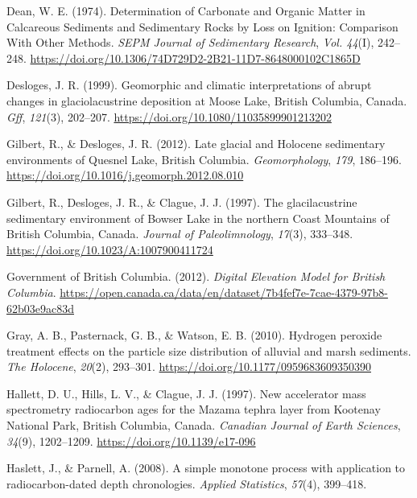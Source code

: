 \documentclass[
  letterpaper,
  DIV=11,
  numbers=noendperiod]{scrartcl}
\newlength{\cslhangindent}
\newenvironment{CSLReferences}[2] %
 {\begin{list}{}{%
  \setlength{\itemindent}{0pt}
  \setlength{\leftmargin}{0pt}
  \setlength{\parsep}{0pt}
  \ifodd #1
   \setlength{\leftmargin}{\cslhangindent}
   \setlength{\itemindent}{-1\cslhangindent}
  \fi
  \setlength{\itemsep}{#2\baselineskip}}}
 {\end{list}}
\begin{document}
\begin{CSLReferences}{1}{0}
Dean, W. E. (1974). {Determination of Carbonate and Organic Matter in
Calcareous Sediments and Sedimentary Rocks by Loss on Ignition:
Comparison With Other Methods}. \emph{SEPM Journal of Sedimentary
Research}, \emph{Vol. 44}(I), 242--248.
\url{https://doi.org/10.1306/74D729D2-2B21-11D7-8648000102C1865D}

Desloges, J. R. (1999). {Geomorphic and climatic interpretations of
abrupt changes in glaciolacustrine deposition at Moose Lake, British
Columbia, Canada}. \emph{Gff}, \emph{121}(3), 202--207.
\url{https://doi.org/10.1080/11035899901213202}

Gilbert, R., \& Desloges, J. R. (2012). {Late glacial and Holocene
sedimentary environments of Quesnel Lake, British Columbia}.
\emph{Geomorphology}, \emph{179}, 186--196.
\url{https://doi.org/10.1016/j.geomorph.2012.08.010}

Gilbert, R., Desloges, J. R., \& Clague, J. J. (1997). {The
glacilacustrine sedimentary environment of Bowser Lake in the northern
Coast Mountains of British Columbia, Canada}. \emph{Journal of
Paleolimnology}, \emph{17}(3), 333--348.
\url{https://doi.org/10.1023/A:1007900411724}

Government of British Columbia. (2012). \emph{{Digital Elevation Model
for British Columbia}}.
\url{https://open.canada.ca/data/en/dataset/7b4fef7e-7cae-4379-97b8-62b03e9ac83d}

Gray, A. B., Pasternack, G. B., \& Watson, E. B. (2010). {Hydrogen
peroxide treatment effects on the particle size distribution of alluvial
and marsh sediments}. \emph{The Holocene}, \emph{20}(2), 293--301.
\url{https://doi.org/10.1177/0959683609350390}

Hallett, D. U., Hills, L. V., \& Clague, J. J. (1997). {New accelerator
mass spectrometry radiocarbon ages for the Mazama tephra layer from
Kootenay National Park, British Columbia, Canada}. \emph{Canadian
Journal of Earth Sciences}, \emph{34}(9), 1202--1209.
\url{https://doi.org/10.1139/e17-096}

Haslett, J., \& Parnell, A. (2008). {A simple monotone process with
application to radiocarbon-dated depth chronologies}. \emph{Applied
Statistics}, \emph{57}(4), 399--418.


\end{CSLReferences}
\end{document}
